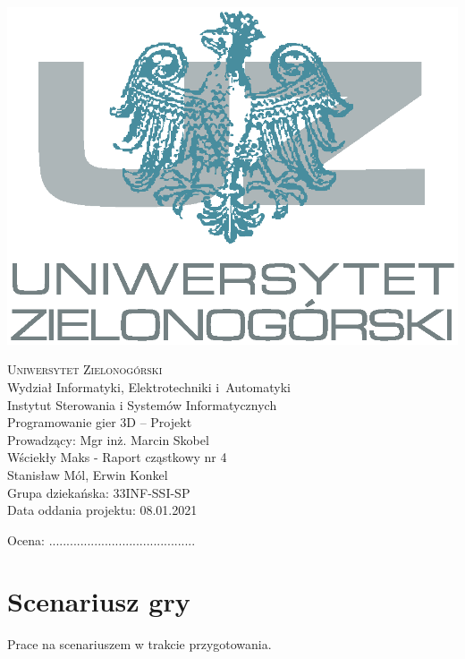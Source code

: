 \documentclass[10pt,a4paper]{article}
\begin{document}
\pagestyle{plain}
\begin{center}
\begin{center}
    \includegraphics[width=.55\textwidth]{logo}
\end{center}
\vspace{0.5cm}
\textsc{\Huge{Uniwersytet Zielonogórski}}\\
\LARGE{Wydział Informatyki, Elektrotechniki i~Automatyki}\\
\large{Instytut Sterowania i Systemów Informatycznych}\\
\vspace{0.5cm}
\Large{Programowanie gier 3D -- Projekt}\\
Prowadzący: Mgr inż. Marcin Skobel \\ 
\vspace{2cm}
\LARGE{Wściekły Maks - Raport cząstkowy nr 4}\\
\vspace{2cm} 
\Large{Stanisław Mól, Erwin Konkel} \\
\Large{Grupa dziekańska: 33INF-SSI-SP} \\
\vspace{0.5cm} 
\Large{Data oddania projektu: 08.01.2021}
\vspace{4cm}
\begin{flushleft}
	Ocena: ..........................................
\end{flushleft}
\vspace{1cm}
\end{center}

\footnotesize
\tableofcontents

\footnotesize
\lstlistoflistings

\noindent\makebox[\linewidth]{\rule{0.6\paperwidth}{0.4pt}}

\section{Scenariusz gry}
Prace na scenariuszem w trakcie przygotowania.
\end{document}
